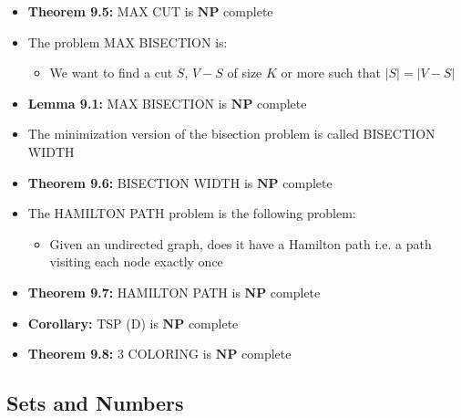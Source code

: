 \documentclass[11pt]{article}
\begin{document}
\begin{itemize}
\item \textbf{Theorem 9.5:} MAX CUT is \(\mathbf{NP}\) complete

\item The problem MAX BISECTION is:
\begin{itemize}
\item We want to find a cut \(S\), \(V-S\) of size \(K\) or more such that \(|S| = |V-S|\)
\end{itemize}
\item \textbf{Lemma 9.1:} MAX BISECTION is \(\mathbf{NP}\) complete

\item The minimization version of the bisection problem is called BISECTION WIDTH
\item \textbf{Theorem 9.6:} BISECTION WIDTH is \(\mathbf{NP}\) complete

\item The HAMILTON PATH problem is the following problem:
\begin{itemize}
\item Given an undirected graph, does it have a Hamilton path i.e. a path visiting each node exactly once
\end{itemize}
\item \textbf{Theorem 9.7:} HAMILTON PATH is \(\mathbf{NP}\) complete

\item \textbf{Corollary:} TSP (D) is \(\mathbf{NP}\) complete

\item \textbf{Theorem 9.8:} \(3\) COLORING is \(\mathbf{NP}\) complete
\end{itemize}

\subsection{Sets and Numbers}
\label{sec:orga6c276e}
\end{document}
